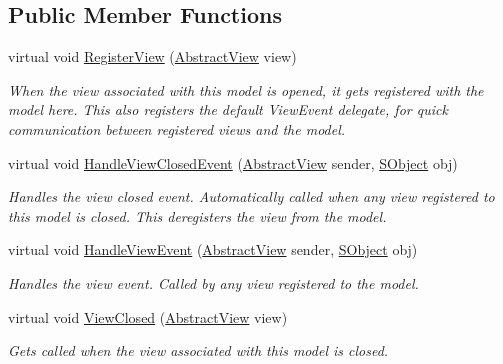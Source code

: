 \subsection*{Public Member Functions}
\begin{DoxyCompactItemize}
\item 
virtual void \hyperlink{class_scaffolding_1_1_abstract_model_a505c8e3a54070efd3c4a7d9016367fed}{Register\+View} (\hyperlink{class_scaffolding_1_1_abstract_view}{Abstract\+View} view)
\begin{DoxyCompactList}\small\item\em When the view associated with this model is opened, it gets registered with the model here. This also registers the default View\+Event delegate, for quick communication between registered views and the model. \end{DoxyCompactList}\item 
virtual void \hyperlink{class_scaffolding_1_1_abstract_model_af196af33f85f9dee1d6c37640e8631a6}{Handle\+View\+Closed\+Event} (\hyperlink{class_scaffolding_1_1_abstract_view}{Abstract\+View} sender, \hyperlink{class_scaffolding_1_1_s_object}{S\+Object} obj)
\begin{DoxyCompactList}\small\item\em Handles the view closed event. Automatically called when any view registered to this model is closed. This deregisters the view from the model. \end{DoxyCompactList}\item 
virtual void \hyperlink{class_scaffolding_1_1_abstract_model_a2a2f77959557dfd2983d4aca57fee9c4}{Handle\+View\+Event} (\hyperlink{class_scaffolding_1_1_abstract_view}{Abstract\+View} sender, \hyperlink{class_scaffolding_1_1_s_object}{S\+Object} obj)
\begin{DoxyCompactList}\small\item\em Handles the view event. Called by any view registered to the model. \end{DoxyCompactList}\item 
virtual void \hyperlink{class_scaffolding_1_1_abstract_model_a5ff673abdc32f2241d610050bfb57939}{View\+Closed} (\hyperlink{class_scaffolding_1_1_abstract_view}{Abstract\+View} view)
\begin{DoxyCompactList}\small\item\em Gets called when the view associated with this model is closed. \end{DoxyCompactList}\end{DoxyCompactItemize}



